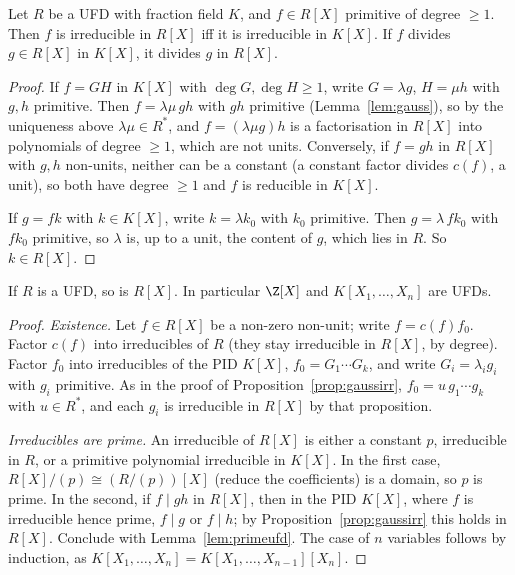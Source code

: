 \begin{proposition}\label{prop:gaussirr}
Let $R$ be a UFD with fraction field $K$, and $f\in R[X]$ primitive of degree $\ge1$. Then $f$ is irreducible in $R[X]$ iff it is irreducible in $K[X]$. If $f$ divides $g\in R[X]$ in $K[X]$, it divides $g$ in $R[X]$.
\end{proposition}
\begin{proof}
If $f=GH$ in $K[X]$ with $\deg G,\deg H\ge1$, write $G=\lambda g$, $H=\mu h$ with $g,h$ primitive. Then $f=\lambda\mu\,gh$ with $gh$ primitive (Lemma~\ref{lem:gauss}), so by the uniqueness above $\lambda\mu\in R^*$, and $f=(\lambda\mu g)h$ is a factorisation in $R[X]$ into polynomials of degree $\ge1$, which are not units. Conversely, if $f=gh$ in $R[X]$ with $g,h$ non-units, neither can be a constant (a constant factor divides $c(f)$, a unit), so both have degree $\ge1$ and $f$ is reducible in $K[X]$.

If $g=fk$ with $k\in K[X]$, write $k=\lambda k_0$ with $k_0$ primitive. Then $g=\lambda\,fk_0$ with $fk_0$ primitive, so $\lambda$ is, up to a unit, the content of $g$, which lies in $R$. So $k\in R[X]$.
\end{proof}

\begin{theorem}[Gauss]\label{thm:gaussufd}
If $R$ is a UFD, so is $R[X]$. In particular $\Z[X]$ and $K[X_1,\dots,X_n]$ are UFDs.
\end{theorem}
\begin{proof}
\emph{Existence.} Let $f\in R[X]$ be a non-zero non-unit; write $f=c(f)f_0$. Factor $c(f)$ into irreducibles of $R$ (they stay irreducible in $R[X]$, by degree). Factor $f_0$ into irreducibles of the PID $K[X]$, $f_0=G_1\cdots G_k$, and write $G_i=\lambda_ig_i$ with $g_i$ primitive. As in the proof of Proposition~\ref{prop:gaussirr}, $f_0=u\,g_1\cdots g_k$ with $u\in R^*$, and each $g_i$ is irreducible in $R[X]$ by that proposition.

\emph{Irreducibles are prime.} An irreducible of $R[X]$ is either a constant $p$, irreducible in $R$, or a primitive polynomial irreducible in $K[X]$. In the first case, $R[X]/(p)\cong(R/(p))[X]$ (reduce the coefficients) is a domain, so $p$ is prime. In the second, if $f\mid gh$ in $R[X]$, then in the PID $K[X]$, where $f$ is irreducible hence prime, $f\mid g$ or $f\mid h$; by Proposition~\ref{prop:gaussirr} this holds in $R[X]$. Conclude with Lemma~\ref{lem:primeufd}. The case of $n$ variables follows by induction, as $K[X_1,\dots,X_n]=K[X_1,\dots,X_{n-1}][X_n]$.
\end{proof}

